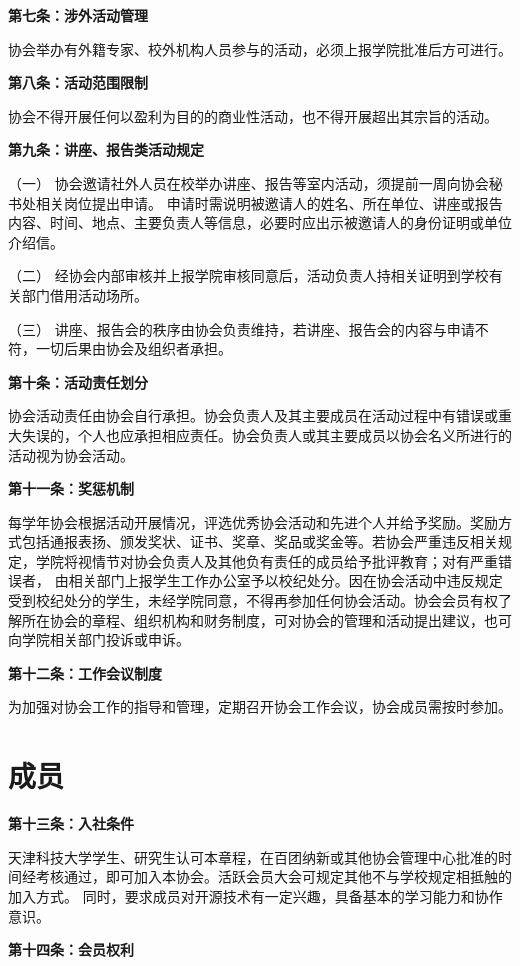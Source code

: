 \documentclass{mjsart}
\begin{document}
\textbf{第七条：涉外活动管理}

协会举办有外籍专家、校外机构人员参与的活动，必须上报学院批准后方可进行。

\textbf{第八条：活动范围限制}

协会不得开展任何以盈利为目的的商业性活动，也不得开展超出其宗旨的活动。

\textbf{第九条：讲座、报告类活动规定}

（一） 协会邀请社外人员在校举办讲座、报告等室内活动，须提前一周向协会秘书处相关岗位提出申请。 申请时需说明被邀请人的姓名、所在单位、讲座或报告内容、时间、地点、主要负责人等信息，必要时应出示被邀请人的身份证明或单位介绍信。

（二） 经协会内部审核并上报学院审核同意后，活动负责人持相关证明到学校有关部门借用活动场所。

（三） 讲座、报告会的秩序由协会负责维持，若讲座、报告会的内容与申请不符，一切后果由协会及组织者承担。

\textbf{第十条：活动责任划分}

协会活动责任由协会自行承担。协会负责人及其主要成员在活动过程中有错误或重大失误的，个人也应承担相应责任。协会负责人或其主要成员以协会名义所进行的活动视为协会活动。

\textbf{第十一条：奖惩机制}

每学年协会根据活动开展情况，评选优秀协会活动和先进个人并给予奖励。奖励方式包括通报表扬、颁发奖状、证书、奖章、奖品或奖金等。若协会严重违反相关规定，学院将视情节对协会负责人及其他负有责任的成员给予批评教育；对有严重错误者， 由相关部门上报学生工作办公室予以校纪处分。因在协会活动中违反规定受到校纪处分的学生，未经学院同意，不得再参加任何协会活动。协会会员有权了解所在协会的章程、组织机构和财务制度，可对协会的管理和活动提出建议，也可向学院相关部门投诉或申诉。

\textbf{第十二条：工作会议制度}

为加强对协会工作的指导和管理，定期召开协会工作会议，协会成员需按时参加。

\section{成员}

\textbf{第十三条：入社条件}

天津科技大学学生、研究生认可本章程，在百团纳新或其他协会管理中心批准的时间经考核通过，即可加入本协会。活跃会员大会可规定其他不与学校规定相抵触的加入方式。 同时，要求成员对开源技术有一定兴趣，具备基本的学习能力和协作意识。

\textbf{第十四条：会员权利}
\end{document}
